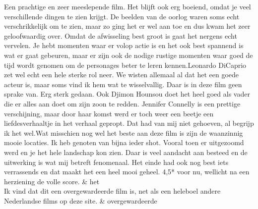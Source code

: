 \begin{table}
\begin{tabu}
Een prachtige en zeer meeslepende film. Het blijft ook erg boeiend, omdat je veel verschillende dingen te zien krijgt. De beelden van de oorlog waren soms echt verschrikkelijk om te zien, maar zo ging het er wel aan toe en dus kwam het zeer geloofwaardig over. Omdat de afwisseling best groot is gaat het nergens echt vervelen. Je hebt momenten waar er volop actie is en het ook best spannend is wat er gaat gebeuren, maar er zijn ook de nodige rustige momenten waar goed de tijd wordt genomen om de personages beter te leren kennen.Leonardo DiCaprio zet wel echt een hele sterke rol neer. We wisten allemaal al dat het een goede acteur is, maar soms vind ik hem wat te wisselvallig. Daar is in deze film geen sprake van. Erg sterk gedaan. Ook Djimon Hounsou doet het heel goed als vader die er alles aan doet om zijn zoon te redden. Jennifer Connelly is een prettige verschijning, maar door haar komst werd er toch weer een beetje een liefdesverhaaltje in het verhaal gepropt. Dat had van mij niet gehoeven, al begrijp ik het wel.Wat misschien nog wel het beste aan deze film is zijn de waanzinnig mooie locaties. Ik heb genoten van bijna ieder shot. Vooral toen er uitgezoomd werd en je het hele landschap kon zien. Daar is veel aandacht aan besteed en de uitwerking is wat mij betreft fenomenaal. Het einde had ook nog best iets verrassends en dat maakt het een heel mooi geheel. 4,5* voor nu, wellicht na een herziening de volle score. & het                                  \\ \hline
Ik vind dat dit een overgewardeerde film is, net als een heleboel andere Nederlandse films op deze site.                                                                                                                                                                                                                                                                                                                                                                                                                                                                                                                                                                                                                                                                                                                                                                                                                                                                                                                                                                                                                                                                                                                                                                                                                                                                                                                                                                                        & overgewardeerde                      \\ \hline
\end{tabu}
\end{table}



